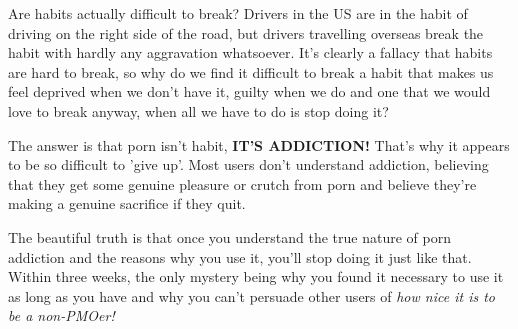 \documentclass[easypeasy.tex]{subfiles}
\begin{document}
Are habits actually difficult to break? Drivers in the US are in the habit of driving on the right side of the road, but drivers travelling overseas break the habit with hardly any aggravation whatsoever. It's clearly a fallacy that habits are hard to break, so why do we find it difficult to break a habit that makes us feel deprived when we don't have it, guilty when we do and one that we would love to break anyway, when all we have to do is stop doing it?

The answer is that porn isn't habit, \textbf{IT'S ADDICTION!} That's why it appears to be so difficult to 'give up'. Most users don't understand addiction, believing that they get some genuine pleasure or crutch from porn and believe they're making a genuine sacrifice if they quit.

The beautiful truth is that once you understand the true nature of porn addiction and the reasons why you use it, you'll stop doing it just like that. Within three weeks, the only mystery being why you found it necessary to use it as long as you have and why you can't persuade other users of \textit{how nice it is to be a non-PMOer!}
\end{document}
